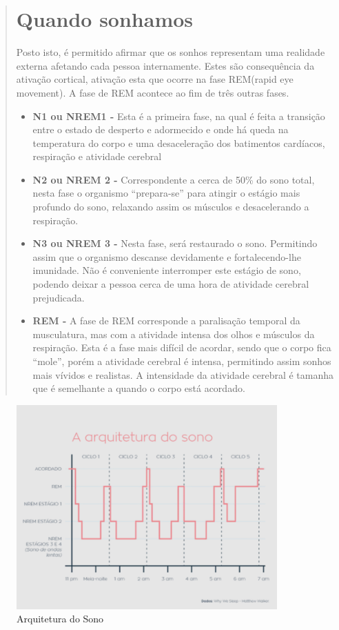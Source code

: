 \documentclass{report}
\begin{document}
\begin{abstract}
\section{Quando sonhamos}
Posto isto, é permitido afirmar que os sonhos representam uma realidade externa afetando cada pessoa internamente. Estes são consequência da ativação cortical, ativação esta que ocorre na fase REM(rapid eye movement). A fase de REM acontece ao fim de três outras fases.
\begin{itemize}
\item \textbf{N1 ou NREM1 -} Esta é  a primeira fase, na qual é feita a transição entre o estado de desperto e adormecido e onde há queda na temperatura do corpo e uma desaceleração dos batimentos cardíacos, respiração e atividade cerebral
\item \textbf{N2 ou NREM 2 -}  Correspondente a cerca de 50\% do sono total, nesta fase o organismo “prepara-se” para atingir o estágio mais profundo do sono, relaxando assim os músculos e desacelerando a respiração.
\item \textbf{N3 ou NREM 3 -}  Nesta fase, será restaurado o sono. Permitindo assim que o organismo descanse devidamente e fortalecendo-lhe imunidade. Não é conveniente interromper este estágio de sono, podendo deixar a pessoa cerca de uma hora de atividade cerebral prejudicada.
\item \textbf{REM -} A fase de REM corresponde a paralisação temporal da musculatura, mas com a atividade intensa dos olhos e músculos da respiração. Esta é a fase mais difícil de acordar, sendo que o corpo fica “mole”, porém a atividade cerebral é intensa, permitindo assim sonhos mais vívidos e realistas. A intensidade da atividade cerebral é tamanha que é semelhante a quando o corpo está acordado.
\end{itemize}

\end{abstract}
\begin{figure}[h]
\center %
\includegraphics[width=100mm]{Arquitetura S.png}
\caption{Arquitetura do Sono}
\label{fig:sono}
\end{figure}
\end{document}

